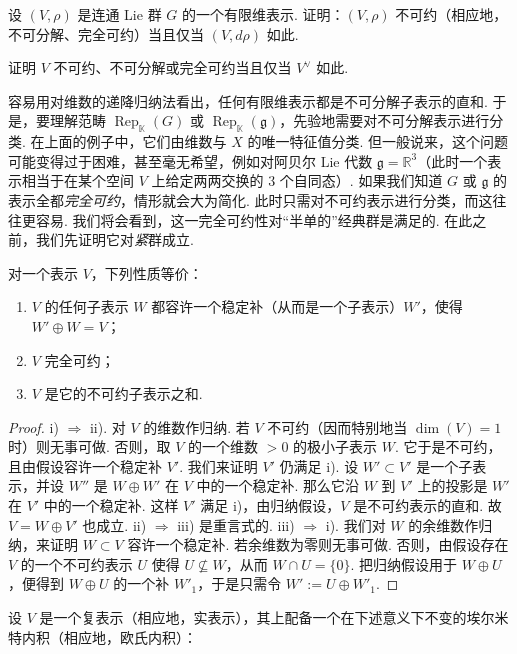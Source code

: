 \begin{numpara}[表示的约化]
\begin{exercise*}
设 $(V,\rho)$ 是连通 Lie 群 $G$ 的一个有限维表示. 证明：$(V,\rho)$ 不可约（相应地，不可分解、完全可约）当且仅当 $(V,d\rho)$ 如此.
\end{exercise*}
\begin{exercise*}
证明 $V$ 不可约、不可分解或完全可约当且仅当 $V^{\vee}$ 如此.
\end{exercise*}
容易用对维数的递降归纳法看出，任何有限维表示都是不可分解子表示的直和. 于是，要理解范畴 $\operatorname{Rep}_{\mathbb K}(G)$ 或 $\operatorname{Rep}_{\mathbb K}(\mathfrak g)$，先验地需要对不可分解表示进行分类. 在上面的例子中，它们由维数与 $X$ 的唯一特征值分类. 但一般说来，这个问题可能变得过于困难，甚至毫无希望，例如对阿贝尔 Lie 代数 $\mathfrak g=\mathbb R^{3}$（此时一个表示相当于在某个空间 $V$ 上给定两两交换的 3 个自同态）.
如果我们知道 $G$ 或 $\mathfrak g$ 的表示全都\emph{完全可约}，情形就会大为简化. 此时只需对不可约表示进行分类，而这往往更容易.
我们将会看到，这一完全可约性对``半单的''经典群是满足的. 在此之前，我们先证明它对\emph{紧}群成立.
\begin{lemma*}
对一个表示 $V$，下列性质等价：
\begin{enumerate}[label=\roman*)]
\item $V$ 的任何子表示 $W$ 都容许一个稳定补（从而是一个子表示）$W'$，使得 $W'\oplus W=V$；
\item $V$ 完全可约；
\item $V$ 是它的不可约子表示之和.
\end{enumerate}
\end{lemma*}
\begin{proof}
i) $\Rightarrow$ ii). 对 $V$ 的维数作归纳. 若 $V$ 不可约（因而特别地当 $\dim(V)=1$ 时）则无事可做. 否则，取 $V$ 的一个维数 $>0$ 的极小子表示 $W$. 它于是不可约，且由假设容许一个稳定补 $V'$. 我们来证明 $V'$ 仍满足 i). 设 $W'\subset V'$ 是一个子表示，并设 $W''$ 是 $W\oplus W'$ 在 $V$ 中的一个稳定补. 那么它沿 $W$ 到 $V'$ 上的投影是 $W'$ 在 $V'$ 中的一个稳定补. 这样 $V'$ 满足 i)，由归纳假设，$V$ 是不可约表示的直和. 故 $V=W\oplus V'$ 也成立.
ii) $\Rightarrow$ iii) 是重言式的.
iii) $\Rightarrow$ i). 我们对 $W$ 的余维数作归纳，来证明 $W\subset V$ 容许一个稳定补. 若余维数为零则无事可做. 否则，由假设存在 $V$ 的一个不可约表示 $U$ 使得 $U\nsubseteq W$，从而 $W\cap U=\{0\}$. 把归纳假设用于 $W\oplus U$，便得到 $W\oplus U$ 的一个补 $W'_{1}$，于是只需令 $W':=U\oplus W'_{1}$.
\end{proof}
\begin{lemma*}
设 $V$ 是一个复表示（相应地，实表示），其上配备一个在下述意义下不变的埃尔米特内积（相应地，欧氏内积）：

\end{lemma*}
\end{numpara}
